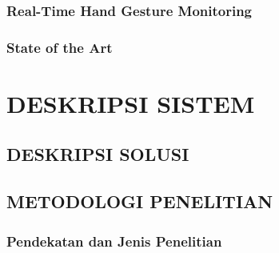 \documentclass[12pt,a4paper,oneside,openany]{report}
\begin{document}
\subsection{Real-Time Hand Gesture Monitoring}
\label{subsec:penelitian-4}

\subsection{State of the Art}
\label{subsec:state-of-the-art}

\chapter{DESKRIPSI SISTEM}
\label{chap:bab3}


\section{DESKRIPSI SOLUSI}
\label{sec:deskripsi-solusi}

\section{METODOLOGI PENELITIAN}
\label{sec:metodologi-penelitian}

\subsection{Pendekatan dan Jenis Penelitian}
\label{subsec:pendekatan-penelitian}
\end{document}
